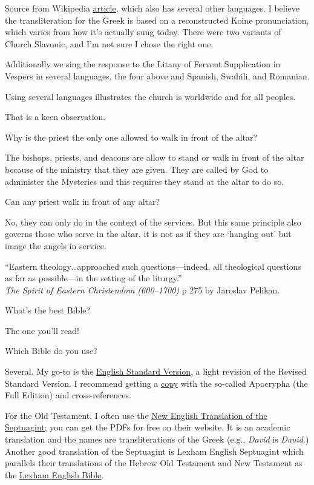\documentclass[
]{article}
\begin{document}
Source from Wikipedia
\href{https://en.wikipedia.org/wiki/Trisagion}{\ul{article}}, which also
has several other languages. I believe the transliteration for the Greek
is based on a reconstructed Koine pronunciation, which varies from how
it's actually sung today. There were two variants of Church Slavonic,
and I'm not sure I chose the right one.

Additionally we sing the response to the Litany of Fervent Supplication
in Vespers in several languages, the four above and Spanish, Swahili,
and Romanian.

Using several languages illustrates the church is worldwide and for all
peoples.

That is a keen observation.

Why is the priest the only one allowed to walk in front of the altar?

The bishops, priests, and deacons are allow to stand or walk in front of
the altar because of the ministry that they are given. They are called
by God to administer the Mysteries and this requires they stand at the
altar to do so.

Can any priest walk in front of any altar?

No, they can only do in the context of the services. But this same
principle also governs those who serve in the altar, it is not as if
they are `hanging out' but image the angels in service.

``Eastern theology\ldots approached such questions---indeed, all
theological questions as far as possible---in the setting of the
liturgy.''\\
\emph{The Spirit of Eastern Christendom (600--1700)} p 275 by Jaroslav
Pelikan.

What's the best Bible?

The one you'll read!

Which Bible do you use?

Several. My go-to is the \href{https://www.esv.org/}{\ul{English
Standard Version}}, a light revision of the Revised Standard Version. I
recommend getting a
\href{https://www.amazon.com/ESV-Diadem-Reference-Apocrypha-ES540/dp/1316513394}{\ul{copy}}
with the so-called Apocrypha (the Full Edition) and cross-references.

For the Old Testament, I often use the
\href{https://ccat.sas.upenn.edu/nets/edition/}{\ul{New English
Translation of the Septuagint}}; you can get the PDFs for free on their
website. It is an academic translation and the names are
transliterations of the Greek (e.g., \emph{David} is \emph{Dauid}.)
Another good translation of the Septuagint is Lexham English Septuagint
which parallels their translations of the Hebrew Old Testament and New
Testament as the
\href{https://www.biblegateway.com/passage/?search=gen+1&version=LEB}{\ul{Lexham
English Bible}}.
\end{document}

